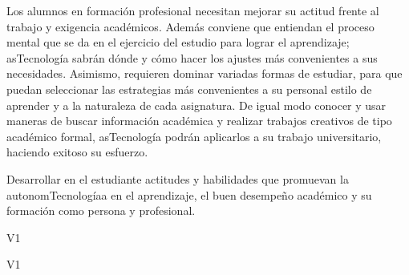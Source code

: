 \begin{syllabus}


\begin{justification}
Los alumnos en formación profesional necesitan mejorar su actitud frente al trabajo y exigencia académicos. Además conviene que entiendan el proceso mental que se da en el ejercicio del estudio para lograr el aprendizaje; asTecnología  sabrán dónde y cómo hacer los ajustes más convenientes a sus necesidades. Asimismo, requieren dominar variadas formas de estudiar, para que puedan seleccionar las estrategias  más convenientes a su personal estilo de aprender y a la naturaleza de cada asignatura. De igual modo conocer y usar  maneras de buscar información académica y realizar trabajos creativos de tipo académico formal, asTecnología podrán  aplicarlos a su trabajo universitario, haciendo exitoso su esfuerzo.
\end{justification}

\begin{goals}
\item Desarrollar en el estudiante actitudes y habilidades que promuevan la autonomTecnologíaa en el aprendizaje, el buen desempeño académico y su formación como persona y profesional.
\end{goals}

\begin{outcomes}{V1}
    \item {}
    \item {}
    \item {}
\end{outcomes}

\begin{competences}{V1}
    \item {}
    \item {}
\end{competences}


\end{syllabus}
